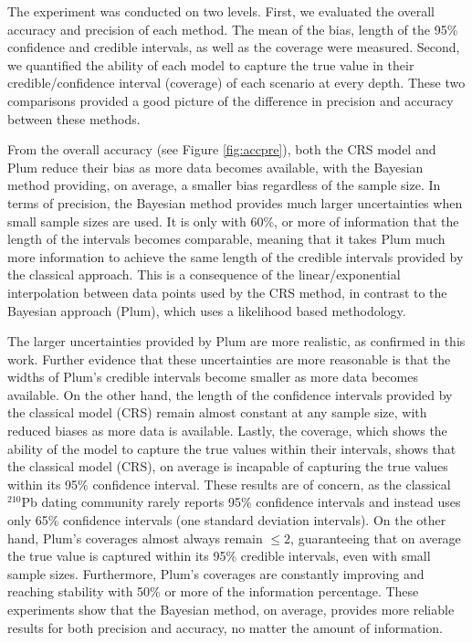 \documentclass [10pt] {article}
\begin{document}
The experiment was conducted on two levels.
First, we evaluated the overall accuracy and precision of each method.
The mean of the bias, length of the 95\% confidence and credible intervals, as well as the coverage were measured.
Second, we quantified the ability of each model to capture the true value in their credible/confidence interval (coverage) of each scenario at every depth. These two comparisons provided a good picture of the difference in precision and accuracy between these methods.


From the overall accuracy (see Figure \ref{fig:accpre}), both the CRS model and Plum reduce their bias as more data becomes available, with the Bayesian method providing, on average, a smaller bias regardless of the sample size. 
In terms of precision, the Bayesian method provides much larger uncertainties when small sample sizes are used. 
It is only with 60\%, or more of information that the length of the intervals becomes comparable, meaning that it takes Plum much more information to achieve the same length of the credible intervals provided by the classical approach. 
This is a consequence of the linear/exponential interpolation between data points used by the CRS method, in contrast to the Bayesian approach (Plum), which uses a likelihood based methodology.  

The larger uncertainties provided by Plum are more realistic, as confirmed in this work.
Further evidence that these uncertainties are more reasonable is that the widths of Plum's credible intervals become smaller as more data becomes available.
On the other hand, the length of the confidence intervals provided by the classical model (CRS) remain almost constant at any sample size, with reduced biases as more data is available.
Lastly, the coverage, which shows the ability of the model to capture the true values within their intervals, shows that the classical model (CRS), on average is incapable of capturing the true values within its 95\% confidence interval. 
These results are of concern, as the classical $^{210}$Pb dating community rarely reports 95\% confidence intervals and instead uses only 65\% confidence intervals (one standard deviation intervals).
On the other hand, Plum's coverages almost always remain $\leq 2$, guaranteeing that on average the true value is captured within its 95\% credible intervals, even with small sample sizes.
Furthermore, Plum's coverages are constantly improving and reaching stability with 50\% or more of the information percentage.
These experiments show that the Bayesian method, on average, provides more reliable results for both precision and accuracy, no matter the amount of information.
\end{document}
